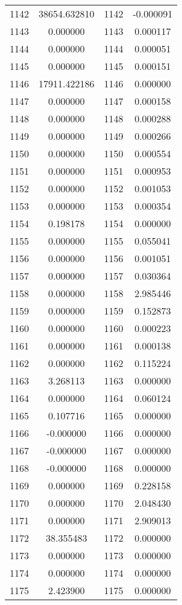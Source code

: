 \documentclass[12pt]{article}
\begin{document}
\begin{longtable}{@{}cccc@{}}
1142 & 38654.632810 & 1142 & -0.000091 \\
1143 & 0.000000 & 1143 & 0.000117 \\
1144 & 0.000000 & 1144 & 0.000051 \\
1145 & 0.000000 & 1145 & 0.000151 \\
1146 & 17911.422186 & 1146 & 0.000000 \\
1147 & 0.000000 & 1147 & 0.000158 \\
1148 & 0.000000 & 1148 & 0.000288 \\
1149 & 0.000000 & 1149 & 0.000266 \\
1150 & 0.000000 & 1150 & 0.000554 \\
1151 & 0.000000 & 1151 & 0.000953 \\
1152 & 0.000000 & 1152 & 0.001053 \\
1153 & 0.000000 & 1153 & 0.000354 \\
1154 & 0.198178 & 1154 & 0.000000 \\
1155 & 0.000000 & 1155 & 0.055041 \\
1156 & 0.000000 & 1156 & 0.001051 \\
1157 & 0.000000 & 1157 & 0.030364 \\
1158 & 0.000000 & 1158 & 2.985446 \\
1159 & 0.000000 & 1159 & 0.152873 \\
1160 & 0.000000 & 1160 & 0.000223 \\
1161 & 0.000000 & 1161 & 0.000138 \\
1162 & 0.000000 & 1162 & 0.115224 \\
1163 & 3.268113 & 1163 & 0.000000 \\
1164 & 0.000000 & 1164 & 0.060124 \\
1165 & 0.107716 & 1165 & 0.000000 \\
1166 & -0.000000 & 1166 & 0.000000 \\
1167 & -0.000000 & 1167 & 0.000000 \\
1168 & -0.000000 & 1168 & 0.000000 \\
1169 & 0.000000 & 1169 & 0.228158 \\
1170 & 0.000000 & 1170 & 2.048430 \\
1171 & 0.000000 & 1171 & 2.909013 \\
1172 & 38.355483 & 1172 & 0.000000 \\
1173 & 0.000000 & 1173 & 0.000000 \\
1174 & 0.000000 & 1174 & 0.000000 \\
1175 & 2.423900 & 1175 & 0.000000 \\

\end{longtable}
\end{document}
